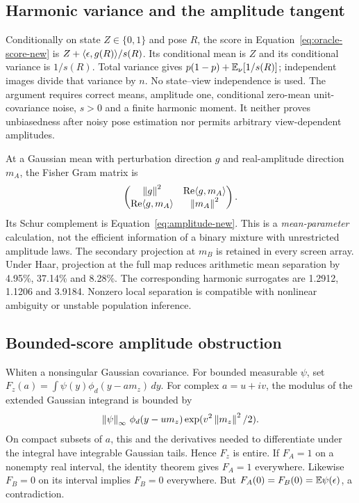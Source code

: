 \subsection{Harmonic variance and the amplitude tangent}
Conditionally on state $Z\in\{0,1\}$ and pose $R$, the score in
Equation~\eqref{eq:oracle-score-new} is
$Z+\langle \epsilon,g(R)\rangle/s(R)$. Its conditional mean is $Z$ and its
conditional variance is $1/s(R)$. Total variance gives
$p(1-p)+\mathbb E_\nu[1/s(R)]$; independent images divide that variance by $n$.
No state--view independence is used. The argument requires correct means,
amplitude one, conditional zero-mean unit-covariance noise, $s>0$ and a
finite harmonic moment. It neither proves unbiasedness after noisy pose
estimation nor permits arbitrary view-dependent amplitudes.

At a Gaussian mean with perturbation direction $g$ and real-amplitude
direction $m_A$, the Fisher Gram matrix is
\begin{equation}
\begin{pmatrix}\left\|g\right\|^2&\operatorname{Re}\langle g,m_A\rangle\\
\operatorname{Re}\langle g,m_A\rangle&\left\|m_A\right\|^2\end{pmatrix}.
\end{equation}
Its Schur complement is Equation~\eqref{eq:amplitude-new}. This is a
\emph{mean-parameter} calculation, not the efficient information of a
binary mixture with unrestricted amplitude laws. The secondary projection
at $m_B$ is retained in every screen array. Under Haar, projection at the
full map reduces arithmetic mean separation by 4.95\%, 37.14\% and 8.28\%.
The corresponding harmonic surrogates are 1.2912, 1.1206 and 3.9184.
Nonzero local separation is compatible with nonlinear ambiguity or unstable
population inference.

\subsection{Bounded-score amplitude obstruction}
Whiten a nonsingular Gaussian covariance. For bounded measurable $\psi$,
set $F_z(a)=\int\psi(y)\phi_d(y-a m_z)\,dy$. For complex $a=u+iv$,
the modulus of the extended Gaussian integrand is bounded by
\begin{equation}
\left\|\psi\right\|_\infty\,\phi_d(y-u m_z)
\exp(v^2\left\|m_z\right\|^2/2).
\end{equation}
On compact subsets of $a$, this and the derivatives needed to differentiate
under the integral have integrable Gaussian tails. Hence $F_z$ is entire.
If $F_A=1$ on a nonempty real interval, the identity theorem gives $F_A=1$
everywhere. Likewise $F_B=0$ on its interval implies $F_B=0$ everywhere.
But $F_A(0)=F_B(0)=\mathbb E\psi(\epsilon)$, a contradiction.

